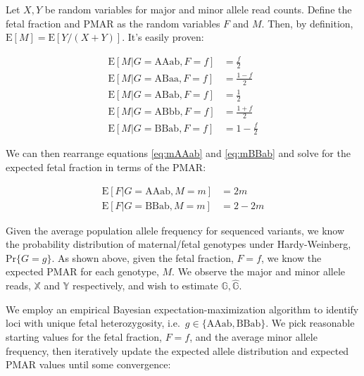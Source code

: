 \documentclass[11pt,letterpaper]{book}
\begin{document}
Let \(X,Y\) be random variables for major and minor allele read counts.
Define the fetal fraction and PMAR as the random variables \(F\) and \(M\). Then, by definition, \(\text{E}[M] = \text{E}[Y/(X + Y)]\).
It's easily proven:

\begin{align}
\text{E}[M \rvert G = \text{AAab}, F = f] &= \frac{f}{2} \label{eq:mAAab} \\
\text{E}[M \rvert G = \text{ABaa}, F = f] &= \frac{1 - f}{2} \label{eq:mABaa} \\
\text{E}[M \rvert G = \text{ABab}, F = f] &= \frac{1}{2} \label{eq:mABab} \\
\text{E}[M \rvert G = \text{ABbb}, F = f] &= \frac{1 + f}{2} \label{eq:mABbb} \\
\text{E}[M \rvert G = \text{BBab}, F = f] &= 1 - \frac{f}{2} \label{eq:mBBab} 
\end{align}

We can then rearrange equations \eqref{eq:mAAab} and \eqref{eq:mBBab} and solve for the expected fetal fraction in terms of the PMAR:

\begin{align}
\text{E}[F \rvert G = \text{AAab}, M = m] &= 2m \label{eq:fAAab} \\
\text{E}[F \rvert G = \text{BBab}, M = m] &= 2 - 2m \label{eq:fBBab} 
\end{align}

Given the average population allele frequency for sequenced variants, we know the probability distribution of maternal/fetal genotypes under Hardy-Weinberg, \(\text{Pr}\{G = g\}\).
As shown above, given the fetal fraction, \(F = f\), we know the expected PMAR for each genotype, \(M\).
We observe the major and minor allele reads, \(\mathbb{X}\) and \(\mathbb{Y}\) respectively, and wish to estimate \(\mathbb{G}, \hat{\mathbb{G}}\).

We employ an empirical Bayesian expectation-maximization algorithm to identify loci with unique fetal heterozygosity, i.e.~\(g \in \{\text{AAab}, \text{BBab}\}\).
We pick reasonable starting values for the fetal fraction, \(F = f\), and the average minor allele frequency, then iteratively update the expected allele distribution and expected PMAR values until some convergence:
\end{document}

